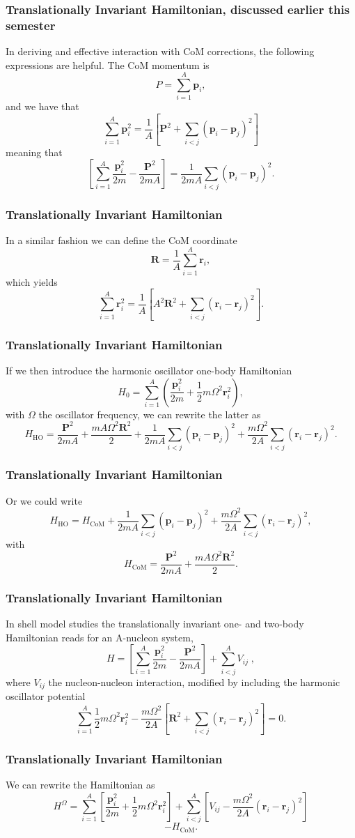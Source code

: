 \documentclass[compress]{beamer}
\renewcommand{\vec}[1]{\mathbf{#1}}
\renewcommand{\vec}[1]{\boldsymbol{#1}}
\begin{document}
 \frame
 {
 \frametitle{Translationally Invariant Hamiltonian, discussed earlier this semester}
 In deriving and effective interaction with CoM corrections, 
 the following expressions are helpful.
 The CoM momentum is
 \[
    P=\sum_{i=1}^A\vec{p}_i,
 \]
 and we have that
 \[
 \sum_{i=1}^A\vec{p}_i^2 =
 \frac{1}{A}\left[\vec{P}^2+\sum_{i<j}(\vec{p}_i-\vec{p}_j)^2\right]
 \]
 meaning that
 \[
 \left[\sum_{i=1}^A\frac{\vec{p}_i^2}{2m} -\frac{\vec{P}^2}{2mA}\right]
 =\frac{1}{2mA}\sum_{i<j}(\vec{p}_i-\vec{p}_j)^2.
 \]
 }


 \frame
 {
 \frametitle{Translationally Invariant Hamiltonian}
 In a similar fashion we can define the CoM coordinate
 \[
     \vec{R}=\frac{1}{A}\sum_{i=1}^{A}\vec{r}_i,
 \]
 which yields
 \[
 \sum_{i=1}^A\vec{r}_i^2 =
 \frac{1}{A}\left[A^2\vec{R}^2+\sum_{i<j}(\vec{r}_i-\vec{r}_j)^2\right].
 \]

 }


 \frame
 {
 \frametitle{Translationally Invariant Hamiltonian}
 If we then introduce the harmonic oscillator one-body Hamiltonian
 \[
      H_0= \sum_{i=1}^A\left(\frac{\vec{p}_i^2}{2m}+
	   \frac{1}{2}m\Omega^2\vec{r}_i^2\right),
 \]
 with $\Omega$ the oscillator frequency,
 we can rewrite the latter as 
 \[
      H_{\mathrm{HO}}= \frac{\vec{P}^2}{2mA}+\frac{mA\Omega^2\vec{R}^2}{2}
	    +\frac{1}{2mA}\sum_{i<j}(\vec{p}_i-\vec{p}_j)^2
	    +\frac{m\Omega^2}{2A}\sum_{i<j}(\vec{r}_i-\vec{r}_j)^2.
     \label{eq:obho}
 \]
 }


 \frame
 {
 \frametitle{Translationally Invariant Hamiltonian}
 Or we could write 
 \[
 H_{\mathrm{HO}}= H_{\mathrm{CoM}}+\frac{1}{2mA}\sum_{i<j}(\vec{p}_i-\vec{p}_j)^2
	    +\frac{m\Omega^2}{2A}\sum_{i<j}(\vec{r}_i-\vec{r}_j)^2,
 \]
 with 
 \[
      H_{\mathrm{CoM}}= \frac{\vec{P}^2}{2mA}+\frac{mA\Omega^2\vec{R}^2}{2}.
 \]

 }


 \frame
 {
 \frametitle{Translationally Invariant Hamiltonian}
 In shell model studies the translationally invariant one- and two-body 
 Hamiltonian reads
 for an A-nucleon system,
 \[\label{eq:ham}
 H=\left[\sum_{i=1}^A\frac{\vec{p}_i^2}{2m} -\frac{\vec{P}^2}{2mA}\right] +\sum_{i<j}^A V_{ij} \; ,
 \]
 where $V_{ij}$ the nucleon-nucleon interaction,
 modified by including the harmonic oscillator potential
 \[
 \sum_{i=1}^A\frac{1}{2}m\Omega^2\vec{r}_i^2-
 \frac{m\Omega^2}{2A}\left[\vec{R}^2+\sum_{i<j}(\vec{r}_i-\vec{r}_j)^2\right]=0.
 \]
 }



 \frame
 {
 \frametitle{Translationally Invariant Hamiltonian}
 We can rewrite the Hamiltonian as
 \[
 H^\Omega=\sum_{i=1}^A \left[ \frac{\vec{p}_i^2}{2m}
 +\frac{1}{2}m\Omega^2 \vec{r}^2_i
 \right] + \sum_{i<j}^A \left[ V_{ij}-\frac{m\Omega^2}{2A}
 (\vec{r}_i-\vec{r}_j)^2
 \right]
 \]
 \[
  -H_{\mathrm{CoM}}.
 \]

 }
\end{document}
